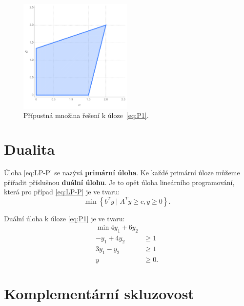\begin{figure}[h!]
    \centering
    \includegraphics[width=0.5\textwidth]{img/ex1.png}   
    \caption{Přípustná množina řešení k úloze~\ref{eq:P1}.}
    \label{fig:ex1}
\end{figure}

\section{Dualita}
Úloha \ref{eq:LP-P} se nazývá \textbf{primární úloha}. Ke každé primární úloze můžeme přiřadit příslušnou \textbf{duální úlohu}. Je to opět úloha lineárního programování, která pro případ \ref{eq:LP-P} je ve tvaru:
\begin{equation}\tag{LP-D}
    \min \left\{ b^T y \mid A^T y \geq c, y \geq 0 \right\}.
    \label{eq:LP-D}
\end{equation}

\begin{pr}
Duální úloha k úloze \ref{eq:P1} je ve tvaru:
\begin{equation}\tag{P2}
    \begin{split}
        \min 4 y_1 + 6 y_2  & \\
        - y_1 + 4 y_2       &\geq 1 \\
        3 y_1 -   y_2       &\geq 1 \\
        y &\geq 0.
    \end{split}
    \label{eq:P2}
\end{equation}
\end{pr}

\section{Komplementární skluzovost}